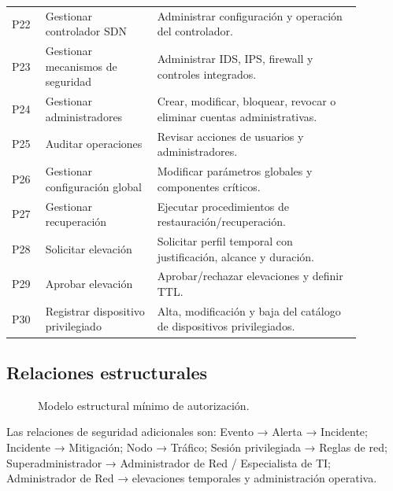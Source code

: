 \documentclass[11pt,a4paper]{article}
\begin{document}
\begin{longtable}{p{0.08\linewidth}p{0.29\linewidth}p{0.51\linewidth}}
P22 & Gestionar controlador SDN & Administrar configuración y operación del controlador.\\
P23 & Gestionar mecanismos de seguridad & Administrar IDS, IPS, firewall y controles integrados.\\
P24 & Gestionar administradores & Crear, modificar, bloquear, revocar o eliminar cuentas administrativas.\\
P25 & Auditar operaciones & Revisar acciones de usuarios y administradores.\\
P26 & Gestionar configuración global & Modificar parámetros globales y componentes críticos.\\
P27 & Gestionar recuperación & Ejecutar procedimientos de restauración/recuperación.\\
P28 & Solicitar elevación & Solicitar perfil temporal con justificación, alcance y duración.\\
P29 & Aprobar elevación & Aprobar/rechazar elevaciones y definir TTL.\\
P30 & Registrar dispositivo privilegiado & Alta, modificación y baja del catálogo de dispositivos privilegiados.\\
\bottomrule
\end{longtable}

\subsection{Relaciones estructurales}

\begin{figure}[H]
\centering
{}
\caption{Modelo estructural mínimo de autorización.}
\end{figure}

Las relaciones de seguridad adicionales son: Evento → Alerta → Incidente; Incidente → Mitigación; Nodo → Tráfico; Sesión privilegiada → Reglas de red; Superadministrador → Administrador de Red / Especialista de TI; Administrador de Red → elevaciones temporales y administración operativa.
\end{document}
